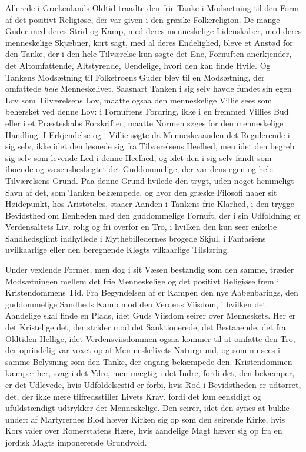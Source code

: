 \documentclass[12pt,a4paper,openany]{book}
\newcommand{\opage}[1]{\marginnote{\footnotesize\textit{[#1]}}}
\begin{document}
Allerede i Grækenlands Oldtid traadte den frie Tanke i
Modsætning til den Form af det positivt Religiøse, der var
given i den græske Folkereligion. De mange Guder med
deres Strid og Kamp, med deres menneskelige Lidenskaber,
\opage{290}med deres menneskelige Skjæbner, kort sagt, med al deres
Endelighed, bleve et Anstød for den Tanke, der i den hele
Tilværelse kun søgte det Ene, Fornuften anerkjender, det
Altomfattende, Altstyrende, Uendelige, hvori den kan finde
Hvile. Og Tankens Modsætning til Folketroens Guder
blev til en Modsætning, der omfattede \emph{hele} Menneskelivet.
Saasnart Tanken i sig selv havde fundet sin egen Lov som
Tilværelsens Lov, maatte ogsaa den menneskelige Villie sees
som behersket ved denne Lov: i Fornuftens Fordring, ikke i
en fremmed Villies Bud eller i et Præsteskabs Forskrifter,
maatte Normen søges for den menneskelige Handling. I
Erkjendelse og i Villie søgte da Menneskeaanden det Regulerende
i sig selv, ikke idet den løsnede sig fra Tilværelsens
Heelhed, men idet den begreb sig selv som levende Led i
denne Heelhed, og idet den i sig selv fandt som iboende og
væsensbeslægtet det Guddommelige, der var dens egen og
hele Tilværelsens Grund. Paa denne Grund hvilede den
trygt, uden noget hemmeligt Savn af det, som Tanken bekæmpede,
og hvor den græske Filosofi naaer sit Høidepunkt,
hos Aristoteles, staaer Aanden i Tankens frie Klarhed, i den
trygge Bevidsthed om Eenheden med den guddommelige Fornuft,
der i sin Udfoldning er Verdensaltets Liv, rolig og
fri overfor en Tro, i hvilken den kun seer enkelte Sandhedsglimt
indhyllede i Mythebilledernes brogede Skjul, i
Fantasiens uvilkaarlige eller den beregnende Kløgts vilkaarlige
Tilsløring.

Under vexlende Former, men dog i sit Væsen bestandig
som den samme, træder Modsætningen mellem det frie Menneskelige
og det positivt Religiøse frem i Kristendommens
Tid. Fra Begyndelsen af er Kampen den nye Aabenbarings,
den guddommelige Sandheds Kamp mod den Verdens Viisdom,
i hvilken det Aandelige skal finde en Plads, idet Guds
Viisdom seirer over Menneskets. Her er det Kristelige det,
der strider mod det Sanktionerede, det Bestaaende, det fra
Oldtiden Hellige, idet Verdensviisdommen ogsaa kommer til
at omfatte den Tro, der oprindelig var voxet op af Men%
\opage{291}neskelivets Naturgrund, og som nu sees i samme Belysning
som den Tanke, der engang bekæmpede den. Kristendommen
kæmper her, svag i det Ydre, men mægtig i det Indre, fordi det,
den bekæmper, er det Udlevede, hvis Udfoldelsestid er forbi,
hvis Rod i Bevidstheden er udtørret, det, der ikke mere tilfredsstiller
Livets Krav, fordi det kun eensidigt og ufuldstændigt
udtrykker det Menneskelige. Den seirer, idet den
synes at bukke under: af Martyrernes Blod hæver Kirken
sig op som den seirende Kirke, hvis Kors vaier over Romerstatens
Hære, hvis aandelige Magt hæver sig op fra en
jordisk Magts imponerende Grundvold.
\end{document}
